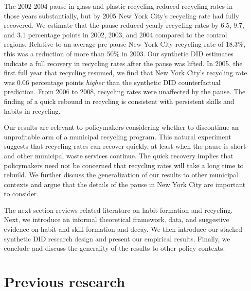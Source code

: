 \documentclass[12pt]{article}
\begin{document}
The 2002-2004 pause in glass and plastic recycling reduced recycling rates in those years substantially, but by 2005 New York City's recycling rate had fully recovered.  We estimate that the pause reduced yearly recycling rates by 6.5, 9.7, and 3.1 percentage points in 2002, 2003, and 2004 compared to the control regions.  Relative to an average pre-pause New York City recycling rate of 18.3\%, this was a reduction of more than 50\% in 2003.  Our synthetic DID estimates indicate a full recovery in recycling rates after the pause was lifted. In 2005, the first full year that recycling resumed, we find that New York City's recycling rate was 0.06 percentage points \textit{higher} than the synthetic DID counterfactual prediction. From 2006 to 2008, recycling rates were unaffected by the pause.  The finding of a quick rebound in recycling is consistent with persistent skills and habits in recycling.

Our results are relevant to policymakers considering whether to discontinue an unprofitable arm of a municipal recycling program.  This natural experiment suggests that recycling rates can recover quickly, at least when the pause is short and other municipal waste services continue.  The quick recovery implies that policymakers need not be concerned that recycling rates will take a long time to rebuild. We further discuss the generalization of our results to other municipal contexts and argue that the details of the pause in New York City are important to consider.

The next section reviews related literature on habit formation and recycling. Next, we introduce an informal theoretical framework, data, and suggestive evidence on habit and skill formation and decay.  We then introduce our stacked synthetic DID research design and present our empirical results.  Finally, we conclude and discuss the generality of the results to other policy contexts.

\section{Previous research}
\end{document}
